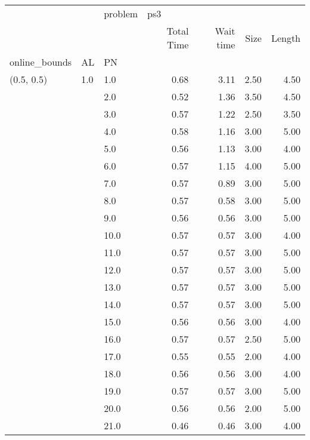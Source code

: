 \begin{tabular}{lllrrrr}
\toprule
           &     & problem & \multicolumn{4}{l}{ps3} \\
           &     & {} & Total Time & Wait time & Size & Length \\
online\_bounds & AL & PN &            &           &      &        \\
\midrule
(0.5, 0.5) & 1.0 & 1.0  &       0.68 &      3.11 & 2.50 &   4.50 \\
           &     & 2.0  &       0.52 &      1.36 & 3.50 &   4.50 \\
           &     & 3.0  &       0.57 &      1.22 & 2.50 &   3.50 \\
           &     & 4.0  &       0.58 &      1.16 & 3.00 &   5.00 \\
           &     & 5.0  &       0.56 &      1.13 & 3.00 &   4.00 \\
           &     & 6.0  &       0.57 &      1.15 & 4.00 &   5.00 \\
           &     & 7.0  &       0.57 &      0.89 & 3.00 &   5.00 \\
           &     & 8.0  &       0.57 &      0.58 & 3.00 &   5.00 \\
           &     & 9.0  &       0.56 &      0.56 & 3.00 &   5.00 \\
           &     & 10.0 &       0.57 &      0.57 & 3.00 &   4.00 \\
           &     & 11.0 &       0.57 &      0.57 & 3.00 &   5.00 \\
           &     & 12.0 &       0.57 &      0.57 & 3.00 &   5.00 \\
           &     & 13.0 &       0.57 &      0.57 & 3.00 &   5.00 \\
           &     & 14.0 &       0.57 &      0.57 & 3.00 &   5.00 \\
           &     & 15.0 &       0.56 &      0.56 & 3.00 &   4.00 \\
           &     & 16.0 &       0.57 &      0.57 & 2.50 &   5.00 \\
           &     & 17.0 &       0.55 &      0.55 & 2.00 &   4.00 \\
           &     & 18.0 &       0.56 &      0.56 & 3.00 &   4.00 \\
           &     & 19.0 &       0.57 &      0.57 & 3.00 &   5.00 \\
           &     & 20.0 &       0.56 &      0.56 & 2.00 &   5.00 \\
           &     & 21.0 &       0.46 &      0.46 & 3.00 &   4.00 \\

\end{tabular}
